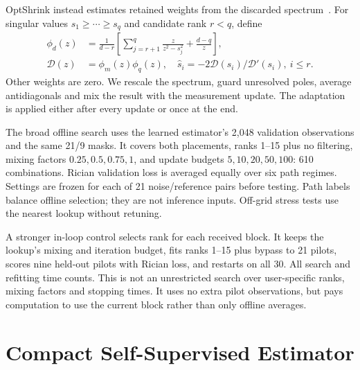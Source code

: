 \documentclass[10pt,journal,letterpaper]{IEEEtran}
\begin{document}
OptShrink instead estimates retained weights from the discarded spectrum~\cite{nadakuditi2014}. For singular values $s_1\ge\cdots\ge s_q$ and candidate rank $r<q$, define
\begin{align}
 \phi_d(z)&=\frac{1}{d-r}\left[\sum_{j=r+1}^{q}\frac{z}{z^2-s_j^2}+\frac{d-q}{z}\right],\nonumber\\
 \mathcal D(z)&=\phi_m(z)\phi_q(z),\quad
 \widehat s_i=-2\mathcal D(s_i)/\mathcal D'(s_i),\ i\le r.
\end{align}
Other weights are zero. We rescale the spectrum, guard unresolved poles, average antidiagonals and mix the result with the measurement update. The adaptation is applied either after every update or once at the end.

The broad offline search uses the learned estimator's 2,048 validation observations and the same 21/9 masks. It covers both placements, ranks 1--15 plus no filtering, mixing factors $0.25,0.5,0.75,1$, and update budgets $5,10,20,50,100$: 610 combinations. Rician validation loss is averaged equally over six path regimes. Settings are frozen for each of 21 noise/reference pairs before testing. Path labels balance offline selection; they are not inference inputs. Off-grid stress tests use the nearest lookup without retuning.

A stronger in-loop control selects rank for each received block. It keeps the lookup's mixing and iteration budget, fits ranks 1--15 plus bypass to 21 pilots, scores nine held-out pilots with Rician loss, and restarts on all 30. All search and refitting time counts. This is not an unrestricted search over user-specific ranks, mixing factors and stopping times. It uses no extra pilot observations, but pays computation to use the current block rather than only offline averages.

\section{Compact Self-Supervised Estimator}
\end{document}
